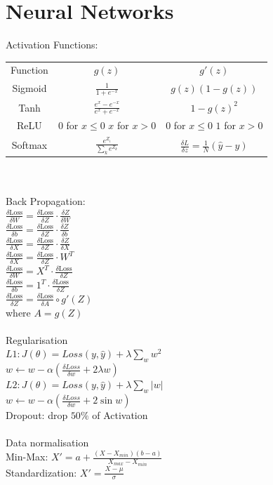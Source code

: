 \documentclass[a4paper, 10pt, twocolumn]{article}
\begin{document}
\section{Neural Networks}
Activation Functions: \\ 
\begin{tabular}{c c c}
	Function & $g(z)$ & $g'(z)$ \\
	Sigmoid & $\frac{1}{1 + e^{-x}}$ & $g(z)(1-g(z))$ \\
	Tanh & $\frac{e^x  - e^{-x}}{e^x + e^{-x}}$ & $1-g(z)^2$ \\
	ReLU & \thead{$0$ for $x \leq 0 $ \\ $x$ for $x>0$} & \thead{$0$ for $x \leq 0 $ \\ $1$ for $x>0$} \\
	Softmax & $\frac{e^{Z_i}}{\sum_k e^{Z_k}}$ & $\frac{\delta L}{\delta z} = \frac{1}{N} (\hat y - y)$
\end{tabular} \\ \\
Back Propagation:\\
$\frac{\delta \textrm{Loss}}{\delta W} = \frac{\delta \textrm{Loss}}{\delta Z} \cdot \frac{\delta Z}{\delta W}$ \\
$\frac{\delta \textrm{Loss}}{\delta b} = \frac{\delta \textrm{Loss}}{\delta Z} \cdot \frac{\delta Z}{\delta b}$ \\
$\frac{\delta \textrm{Loss}}{\delta X} = \frac{\delta \textrm{Loss}}{\delta Z} \cdot \frac{\delta Z}{\delta X}$ \\
$\frac{\delta \textrm{Loss}}{\delta X} = \frac{\delta \textrm{Loss}}{\delta Z} \cdot W^T$ \\
$\frac{\delta \textrm{Loss}}{\delta W} = X^T \cdot \frac{\delta \textrm{Loss}}{\delta Z}$ \\
$\frac{\delta \textrm{Loss}}{\delta b} = 1^T \cdot \frac{\delta \textrm{Loss}}{\delta Z}$ \\
$\frac{\delta \textrm{Loss}}{\delta Z} = \frac{\delta \textrm{Loss}}{\delta A} \circ g'(Z)$ \\
where $A = g(Z)$ \\ \\ Regularisation \\
$L1: J(\theta) = \textit{Loss}(y,\hat y) + \lambda \sum_w w^2$ \\
$w \leftarrow w - \alpha(\frac{\delta \textit{Loss}}{\delta w} + 2 \lambda w)$ \\
$L2: J(\theta) = \textit{Loss}(y,\hat y) + \lambda \sum_w |w|$ \\
$w \leftarrow w - \alpha(\frac{\delta \textit{Loss}}{\delta w} + 2 \sin w)$ \\
Dropout: drop $50\%$ of Activation \\ \\
Data normalisation\\
Min-Max: $X' = a + \frac{(X -X_{min})(b-a)}{X_{max}-X_{min}}$ \\
Standardization: $X' = \frac{X-\mu}{\sigma }$
\end{document}
